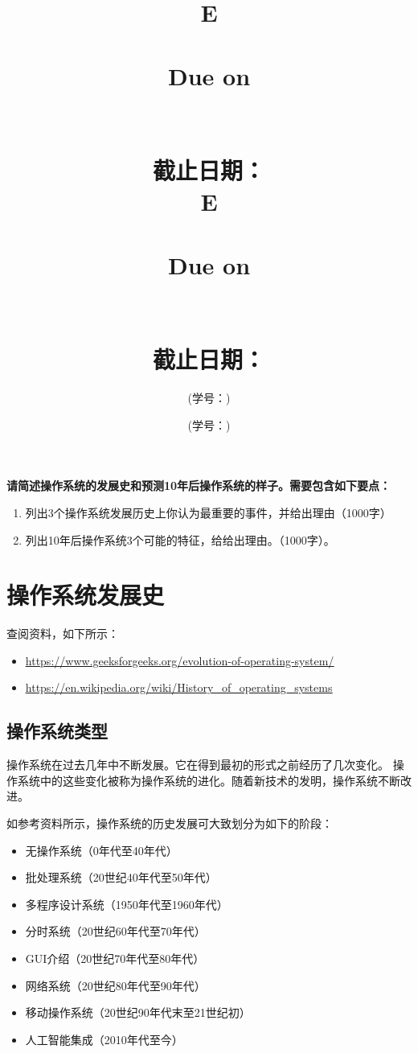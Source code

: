 \documentclass[UTF8]{homework}
\date{} %
\title{
        \vspace{3in}
        \if\hmwkLanguage E
            \huge{\textbf{\hmwkClass}}\\
            \vspace{0.4in}
            \huge{\textbf{\hmwkTitle}}\\
            \vspace{0.4in}
            \normalsize{Due on \hmwkDueDate}\\
        \else
            \Huge{\textbf{\hmwkClassCN}}\\
            \vspace{0.3in}
            \Huge{\textbf{\hmwkTitleCN}}\\
            \vspace{0.4in}
            \normalsize{截止日期：\hmwkDueDateCN}\\
        \fi
        \vspace{2.4in}
    }
\author{\hmwkAuthorName}
\author{\hmwkAuthorNameCN (学号：\hmwkAuthorIDCN)}
\date{}
\title{
        \if\hmwkLanguage E
            \huge{\textbf{\hmwkClass}}\\
            \vspace{0.05in}
            \huge{\textbf{\hmwkTitle}}\\
            \vspace{0.2in}
            \normalsize{Due on \hmwkDueDate}\\
        \else
            \Huge{\textbf{\hmwkClassCN}}\\
            \vspace{0.05in}
            \Huge{\textbf{\hmwkTitleCN}}\\
            \vspace{0.2in}
            \normalsize{截止日期：\hmwkDueDateCN}\\
        \fi
    }
\author{\hmwkAuthorName}
\author{\hmwkAuthorNameCN (学号：\hmwkAuthorIDCN)}
\date{}
\begin{document}
\maketitle
\if{}
    \pagebreak
\fi


%
%
\begin{homeworkProblem}
\textbf{    请简述操作系统的发展史和预测10年后操作系统的样子。需要包含如下要点：}
    \begin{enumerate}
    	\item 列出3个操作系统发展历史上你认为最重要的事件，并给出理由（1000字）
    	\item 列出10年后操作系统3个可能的特征，给给出理由。（1000字）。
    \end{enumerate}
    
\solution

\section{操作系统发展史}

查阅资料，如下所示：

\begin{itemize}
    \item \href{https://www.geeksforgeeks.org/evolution-of-operating-system/}{\underline{https://www.geeksforgeeks.org/evolution-of-operating-system/}}
    \item \href{https://en.wikipedia.org/wiki/History\_of\_operating\_systems}{\underline{https://en.wikipedia.org/wiki/History\_of\_operating\_systems}}
\end{itemize}

\subsection{操作系统类型}

操作系统在过去几年中不断发展。它在得到最初的形式之前经历了几次变化。
操作系统中的这些变化被称为操作系统的进化。随着新技术的发明，操作系统不断改进。

如参考资料所示，操作系统的历史发展可大致划分为如下的阶段：

\begin{itemize}
    \item 无操作系统（0年代至40年代）
    \item 批处理系统（20世纪40年代至50年代）
    \item 多程序设计系统（1950年代至1960年代）
    \item 分时系统（20世纪60年代至70年代）
    \item GUI介绍（20世纪70年代至80年代）
    \item 网络系统（20世纪80年代至90年代）
    \item 移动操作系统（20世纪90年代末至21世纪初）
    \item 人工智能集成（2010年代至今）
\end{itemize}


\end{homeworkProblem}
\end{document}
